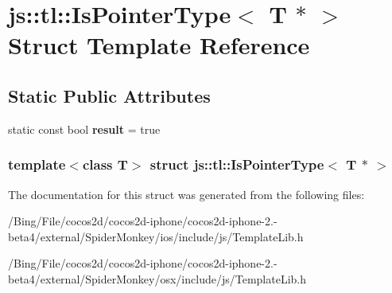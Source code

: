 \hypertarget{structjs_1_1tl_1_1_is_pointer_type_3_01_t_01_5_01_4}{\section{js\-:\-:tl\-:\-:Is\-Pointer\-Type$<$ T $\ast$ $>$ Struct Template Reference}
\label{structjs_1_1tl_1_1_is_pointer_type_3_01_t_01_5_01_4}
}
\subsection*{Static Public Attributes}
\begin{DoxyCompactItemize}
\item 
\hypertarget{structjs_1_1tl_1_1_is_pointer_type_3_01_t_01_5_01_4_aee795f51a1fa20bffa1bf208429a3649}{static const bool {\bfseries result} = true}\label{structjs_1_1tl_1_1_is_pointer_type_3_01_t_01_5_01_4_aee795f51a1fa20bffa1bf208429a3649}

\end{DoxyCompactItemize}
\subsubsection*{template$<$class T$>$ struct js\-::tl\-::\-Is\-Pointer\-Type$<$ T $\ast$ $>$}



The documentation for this struct was generated from the following files\-:\begin{DoxyCompactItemize}
\item 
/\-Bing/\-File/cocos2d/cocos2d-\/iphone/cocos2d-\/iphone-\/2.-\/beta4/external/\-Spider\-Monkey/ios/include/js/Template\-Lib.\-h\item 
/\-Bing/\-File/cocos2d/cocos2d-\/iphone/cocos2d-\/iphone-\/2.-\/beta4/external/\-Spider\-Monkey/osx/include/js/Template\-Lib.\-h\end{DoxyCompactItemize}
